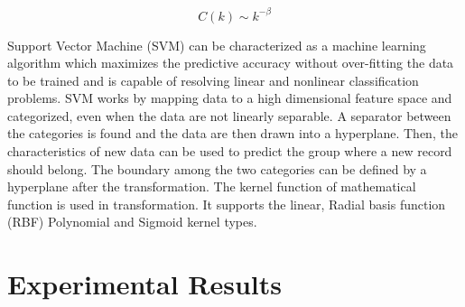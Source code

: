 \documentclass{llncs}
\begin{document}
\begin{equation}
C(k) \sim k^{-\beta}
\end{equation}


Support Vector Machine (SVM) can be characterized as a machine learning algorithm which maximizes the predictive accuracy without over-fitting the data to be trained and is capable of resolving linear and nonlinear classification problems. SVM works by mapping data to a high dimensional feature space and categorized, even when the data are not linearly separable. A separator between the categories is found and the data are then drawn into a hyperplane. Then, the characteristics of new data can be used to predict the group where a new record should belong. The boundary among the two categories can be defined by a hyperplane after the transformation. The kernel function of mathematical function is used in transformation. It supports the linear, Radial basis function (RBF) Polynomial and Sigmoid kernel types.


\section{Experimental Results}
\end{document}
